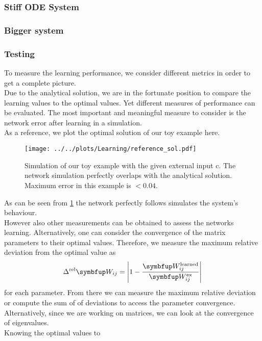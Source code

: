 \subsubsection{Stiff ODE System}

\subsubsection{Bigger system}


\subsubsection{Testing}
To measure the learning performance, we consider different metrics in order to get a complete picture.\\
Due to the analytical solution, we are in the fortunate position to compare the learning values to the optimal values. Yet different measures of performance can be evaluated. The most important and meaningful measure to consider is the network error after learning in a simulation.\\
As a reference, we plot the optimal solution of our toy example here.
\begin{figure}
	\centering
	\texttt{[image: ../../plots/Learning/reference\_sol.pdf]}
	\caption{Simulation of our toy example with the given external input c. The network simulation perfectly overlaps with the analytical solution. Maximum error in this example is $<0.04$.}
	\label{fig:reference_sol}
\end{figure}
As can be seen from \cref{fig:reference_sol} the network perfectly follows simulates the system's behaviour.\\
However also other measurements can be obtained to assess the networks learning. Alternatively, one can consider the convergence of the matrix parameters to their optimal values. Therefore, we measure the maximum relative deviation from the optimal value as
\begin{equation}\label{eq:largest_rel_dev}
	\Delta^\text{rel} \bmu{W}_{ij} =\left|1 - \frac{\bmu{W}^{\text{learned}}_{ij}}{\bmu{W}^\text{ex}_{ij}}\right|
\end{equation}
for each parameter. From there we can measure the maximum relative deviation or compute the sum of of deviations to access the parameter convergence.\\
Alternatively, since we are working on matrices, we can look at the convergence of eigenvalues.\\
Knowing the optimal values to
